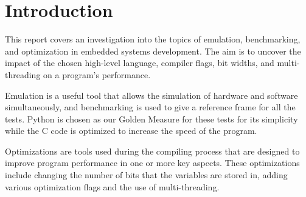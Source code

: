 \section{Introduction}
This report covers an investigation into the topics of emulation, benchmarking, and optimization in embedded systems development.
The aim is to uncover the impact of the chosen high-level language, compiler flags, bit widths, and multi-threading on a program's performance.

Emulation is a useful tool that allows the simulation of hardware and software simultaneously,
and benchmarking is used to give a reference frame for all the tests.
Python is chosen as our Golden Measure for these tests for its simplicity while the C code is optimized to increase the speed of the program.

Optimizations are tools used during the compiling process that are designed to improve program performance in one or more key aspects.
These optimizations include changing the number of bits that the variables are stored in, adding various optimization flags and the use of multi-threading.
